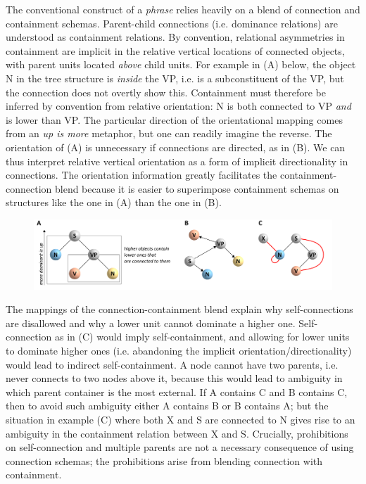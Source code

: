   The conventional construct of a \textit{phrase} relies heavily on a blend of connection and containment schemas. Parent-child connections (i.e. dominance relations) are understood as containment relations. By convention, relational asymmetries in containment are implicit in the relative vertical locations of connected objects, with parent units located \textit{above} child units. For example in (A) below, the object N in the tree structure is \textit{inside} the VP, i.e. is a subconstituent of the VP, but the connection does not overtly show this. Containment must therefore be inferred by convention from relative orientation: N is both connected to VP \textit{and} is lower than VP. The particular direction of the orientational mapping comes from an \textit{up is more} metaphor, but one can readily imagine the reverse. The orientation of (A) is unnecessary if connections are directed, as in (B). We can thus interpret relative vertical orientation as a form of implicit directionality in connections. The orientation information greatly facilitates the containment-connection blend because it is easier to superimpose containment schemas on structures like the one in (A) than the one in (B). 

  
\begin{figure}
\includegraphics[width=\textwidth]{figures/Tilsen-img35.png}
\caption{\missingcaption}
\label{fig:3:7}
\end{figure}
 

  The mappings of the connection-containment blend explain why self-connections are disallowed and why a lower unit cannot dominate a higher one. Self-connection as in (C) would imply self-containment, and allowing for lower units to dominate higher ones (i.e. abandoning the implicit orientation/directionality) would lead to indirect self-containment. A node cannot have two parents, i.e. never connects to two nodes above it, because this would lead to ambiguity in which parent container is the most external. If A contains C and B contains C, then to avoid such ambiguity either A contains B or B contains A; but the situation in example (C) where both X and S are connected to N gives rise to an ambiguity in the containment relation between X and S. Crucially, prohibitions on self-connection and multiple parents are not a necessary consequence of using connection schemas; the prohibitions arise from blending connection with containment.


